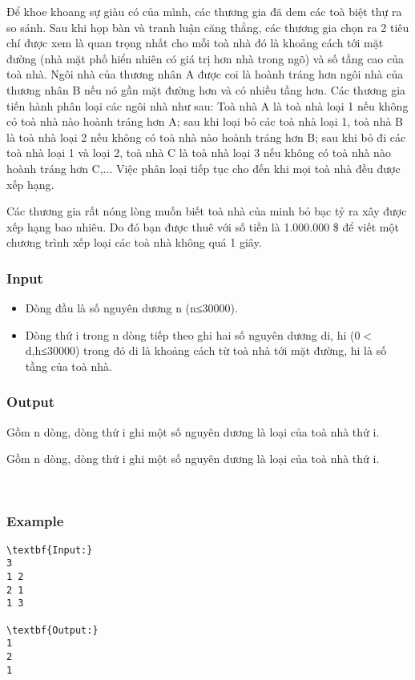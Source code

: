 

Để khoe khoang sự giàu có của mình, các thương gia đã dem các toà biệt thự ra so sánh. Sau khi họp bàn và tranh luận căng thẳng, các thương gia chọn ra 2 tiêu chí được xem là quan trọng nhất cho mỗi toà nhà đó là khoảng cách tới mặt đường (nhà mặt phố hiển nhiên có giá trị hơn nhà trong ngõ) và số tầng cao của toà nhà. Ngôi nhà của thương nhân A được coi là hoành tráng hơn ngôi nhà của thương nhân B nếu nó gần mặt đường hơn và có nhiều tầng hơn. Các thương gia tiến hành phân loại các ngôi nhà như sau: Toà nhà A là toà nhà loại 1 nếu không có toà nhà nào hoành tráng hơn A; sau khi loại bỏ các toà nhà loại 1, toà nhà B là toà nhà loại 2 nếu không có toà nhà nào hoành tráng hơn B; sau khi bỏ đi các toà nhà loại 1 và loại 2, toà nhà C là toà nhà loại 3 nếu không có toà nhà nào hoành tráng hơn C,... Việc phân loại tiếp tục cho đến khi mọi toà nhà đều được xếp hạng.

Các thương gia rất nóng lòng muốn biết toà nhà của minh bỏ bạc tỷ ra xây được xếp hạng bao nhiêu. Do đó bạn được thuê với số tiền là 1.000.000 \$ để viết một chương trình xếp loại các toà nhà không quá 1 giây.

\subsubsection{Input}
\begin{itemize}
	\item Dòng đầu là số nguyên dương n (n≤30000).
	\item Dòng thứ i trong n dòng tiếp theo ghi hai số nguyên dương di, hi (0$<$d,h≤30000) trong đó di là khoảng cách từ toà nhà tới mặt đường, hi là số tầng của toà nhà.
\end{itemize}

\subsubsection{Output}

Gồm n dòng, dòng thứ i ghi một số nguyên dương là loại của toà nhà thứ i.

Gồm n dòng, dòng thứ i ghi một số nguyên dương là loại của toà nhà thứ i.

 

\subsubsection{Example}
\begin{verbatim}
\textbf{Input:}
3
1 2
2 1
1 3

\textbf{Output:}
1
2
1\end{verbatim}